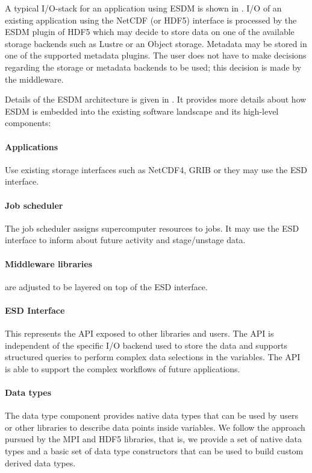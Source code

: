 A typical I/O-stack for an application using ESDM is shown in .
I/O of an existing application using the NetCDF (or HDF5) interface is processed by the ESDM plugin of HDF5 which may decide to store data on one of the available
storage backends such as Lustre or an Object storage.
Metadata may be stored in one of the supported metadata plugins.
The user does not have to make decisions regarding the storage or metadata backends to be used; this decision is made by the middleware.

\bigskip


Details of the ESDM architecture is given in .
It provides more details about how ESDM is embedded into the existing software landscape and its high-level components:

\paragraph{Applications}
Use existing storage interfaces such as NetCDF4, GRIB or they may use the ESD interface.

\paragraph{Job scheduler}
The job scheduler assigns supercomputer resources to jobs.
It may use the ESD interface to inform about future activity and stage/unstage data.


\paragraph{Middleware libraries} are adjusted to be layered on top of the ESD interface.


\paragraph{ESD Interface}
This represents the API exposed to other libraries and users.
The API is independent of the specific I/O backend used to store the data and supports structured queries to perform complex data selections in the variables.
The API is able to support the complex workflows of future applications.

\paragraph{Data types}
The data type component provides native data types that can be used by users or other libraries to describe data points inside variables.
We follow the approach pursued by the MPI and HDF5 libraries, that is, we provide a set of native data types and a basic set of data type constructors that can be used to build custom derived data types.

